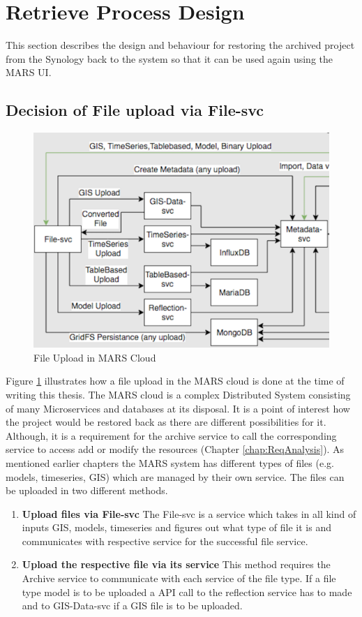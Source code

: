 \section{Retrieve Process Design}
This section describes the design and behaviour for restoring the archived project from the Synology back to the system
so that it can be used again using the MARS UI.   

\subsection{Decision of File upload via File-svc}

\begin{figure}[H]
    \centering \includegraphics[scale=0.6]{grafiken/mars-cloud.png}
    \caption{File Upload in MARS Cloud \cite{MARSCLoud}}
    \label{fig:MARSCloud}
\end{figure}

Figure \ref{fig:MARSCloud} illustrates how a file upload in the MARS cloud is done at the time of writing this thesis. 
The MARS cloud is a complex Distributed System consisting of many 
Microservices and databases at its disposal. It is a point of interest how the project would be restored back as there are different possibilities for it. 
Although, it is a requirement for the archive service
to call the corresponding service to access add or modify the resources (Chapter \ref{chap:ReqAnalysis}). As mentioned earlier chapters the MARS system
has different types of files (e.g. models, timeseries, GIS) which are managed by their own service. The files can be uploaded in two different methods.
\begin{enumerate}
 \item \textbf{Upload files via File-svc} The File-svc is a service which takes in all kind of inputs GIS, models, timeseries and figures out what type of
    file it is and communicates with respective service for the successful file service. 
 \item \textbf{Upload the respective file via its service} This method requires the Archive service to communicate with each service of the file type. If a file type
 model is to be uploaded a API call to the reflection service has to made and to GIS-Data-svc if a GIS file is to be uploaded.
\end{enumerate} 

